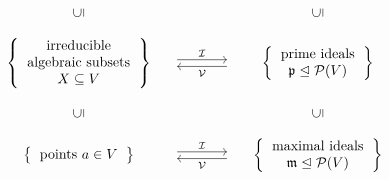 \begin{theorem}
\begin{enumerate}
\[\begin{matrix}
            {}
          & {}
          & {}
          \\
            \rotatebox[origin=c]{90}{$\subseteq$}
          & {}
          & \rotatebox[origin=c]{90}{$\subseteq$}
          \\
            {}
          & {}
          & {}
          \\
            \left\{
              \begin{tabular}{c}
                  irreducible \\
                  algebraic subsets \\
                  $X \subseteq V$
              \end{tabular}
            \right\}
          & \begin{tikzcd}[column sep = large]
                {}
                \arrow[shift left]{r}{\mc{I}}
              & {}
                \arrow[shift left]{l}{\mc{V}}
            \end{tikzcd}
          & \left\{
              \begin{tabular}{c}
                prime ideals \\
                $\mf{p} \idealeq \mc{P}(V)$
              \end{tabular}
            \right\}
          \\
            {}
          & {}
          & {}
          \\
            \rotatebox[origin=c]{90}{$\subseteq$}
          & {}
          & \rotatebox[origin=c]{90}{$\subseteq$}
          \\
            {}
          & {}
          & {}
          \\
            \left\{
              \begin{tabular}{c}
                points $a \in V$
              \end{tabular}
            \right\}
          & \begin{tikzcd}[column sep = large]
                {}
                \arrow[shift left]{r}{\mc{I}}
              & {}
                \arrow[shift left]{l}{\mc{V}}
            \end{tikzcd}
          & \left\{
              \begin{tabular}{c}
                maximal ideals \\
                $\mf{m} \idealeq \mc{P}(V)$
              \end{tabular}
            \right\}
        \end{matrix}
      \]
  \end{enumerate}
\end{theorem}


